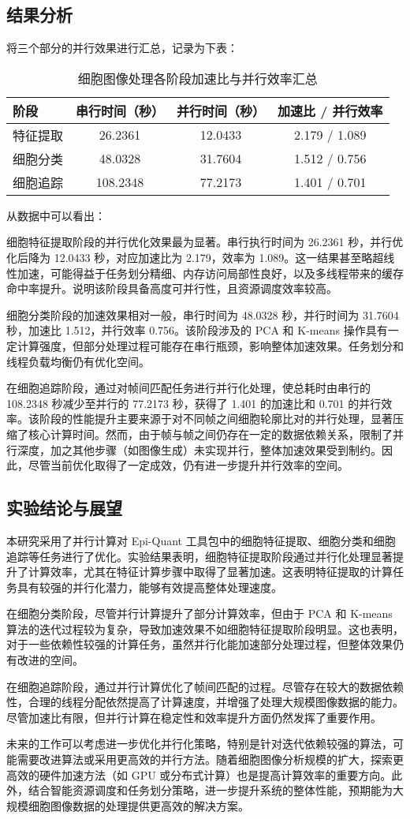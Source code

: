 \subsection{结果分析}
将三个部分的并行效果进行汇总，记录为下表：
\begin{table}[htbp]
    \centering
    \caption{细胞图像处理各阶段加速比与并行效率汇总}
    \begin{tabular}{lccc}
    \toprule
    阶段 & 串行时间（秒） & 并行时间（秒） & 加速比 / 并行效率 \\
    \midrule
    特征提取 & 26.2361 & 12.0433 & 2.179 / 1.089 \\
    细胞分类 & 48.0328 & 31.7604 & 1.512 / 0.756 \\
    细胞追踪 & 108.2348 & 77.2173 & 1.401 / 0.701 \\
    \bottomrule
    \end{tabular}
\end{table}
从数据中可以看出：

细胞特征提取阶段的并行优化效果最为显著。串行执行时间为 26.2361 秒，并行优化后降为 12.0433 秒，对应加速比为 2.179，效率为 1.089。这一结果甚至略超线性加速，可能得益于任务划分精细、内存访问局部性良好，以及多线程带来的缓存命中率提升。说明该阶段具备高度可并行性，且资源调度效率较高。

细胞分类阶段的加速效果相对一般，串行时间为 48.0328 秒，并行时间为 31.7604 秒，加速比 1.512，并行效率 0.756。该阶段涉及的 PCA 和 K-means 操作具有一定计算强度，但部分处理过程可能存在串行瓶颈，影响整体加速效果。任务划分和线程负载均衡仍有优化空间。

在细胞追踪阶段，通过对帧间匹配任务进行并行化处理，使总耗时由串行的 108.2348 秒减少至并行的 77.2173 秒，获得了 1.401 的加速比和 0.701 的并行效率。该阶段的性能提升主要来源于对不同帧之间细胞轮廓比对的并行处理，显著压缩了核心计算时间。然而，由于帧与帧之间仍存在一定的数据依赖关系，限制了并行深度，加之其他步骤（如图像生成）未实现并行，整体加速效果受到制约。因此，尽管当前优化取得了一定成效，仍有进一步提升并行效率的空间。

\subsection{实验结论与展望}
本研究采用了并行计算对 Epi-Quant 工具包中的细胞特征提取、细胞分类和细胞追踪等任务进行了优化。实验结果表明，细胞特征提取阶段通过并行化处理显著提升了计算效率，尤其在特征计算步骤中取得了显著加速。这表明特征提取的计算任务具有较强的并行化潜力，能够有效提高整体处理速度。

在细胞分类阶段，尽管并行计算提升了部分计算效率，但由于 PCA 和 K-means 算法的迭代过程较为复杂，导致加速效果不如细胞特征提取阶段明显。这也表明，对于一些依赖性较强的计算任务，虽然并行化能加速部分处理过程，但整体效果仍有改进的空间。

在细胞追踪阶段，通过并行计算优化了帧间匹配的过程。尽管存在较大的数据依赖性，合理的线程分配依然提高了计算速度，并增强了处理大规模图像数据的能力。尽管加速比有限，但并行计算在稳定性和效率提升方面仍然发挥了重要作用。

未来的工作可以考虑进一步优化并行化策略，特别是针对迭代依赖较强的算法，可能需要改进算法或采用更高效的并行方法。随着细胞图像分析规模的扩大，探索更高效的硬件加速方法（如 GPU 或分布式计算）也是提高计算效率的重要方向。此外，结合智能资源调度和任务划分策略，进一步提升系统的整体性能，预期能为大规模细胞图像数据的处理提供更高效的解决方案。






